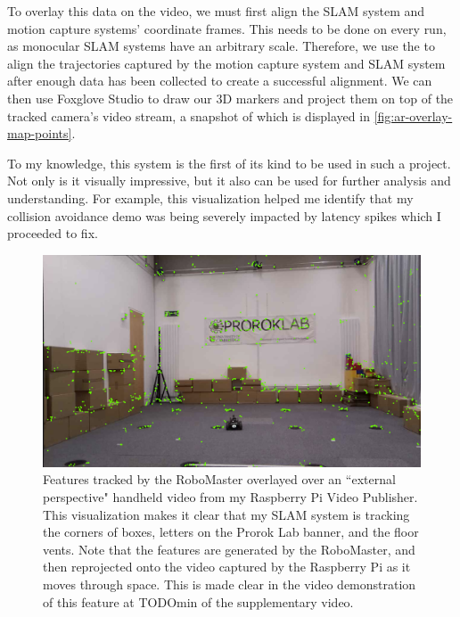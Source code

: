 To overlay this data on the video, we must first align the SLAM system and motion capture systems' coordinate frames. This needs to be done on every run, as monocular SLAM systems have an arbitrary scale. Therefore, we use the  to align the trajectories captured by the motion capture system and SLAM system after enough data has been collected to create a successful alignment. We can then use Foxglove Studio to draw our 3D markers and project them on top of the tracked camera's video stream, a snapshot of which is displayed in \autoref{fig:ar-overlay-map-points}.

To my knowledge, this system is the first of its kind to be used in such a project. Not only is it visually impressive, but it also can be used for further analysis and understanding. For example, this visualization helped me identify that my collision avoidance demo was being severely impacted by latency spikes which I proceeded to fix.

\begin{figure}[h]
    \centering
    \includegraphics[width=0.8\linewidth]{figures/ar_overlay_map_points.png}

    \caption{Features tracked by the RoboMaster overlayed over an ``external perspective" handheld video from my Raspberry Pi Video Publisher. This visualization makes it clear that my SLAM system is tracking the corners of boxes, letters on the Prorok Lab banner, and the floor vents. \captionbreak Note that the features are generated by the RoboMaster, and then reprojected onto the video captured by the Raspberry Pi as it moves through space. This is made clear in the video demonstration of this feature at TODOmin of the supplementary video\protect\footnotemark[1].}
    \label{fig:ar-overlay-map-points}
\end{figure}

